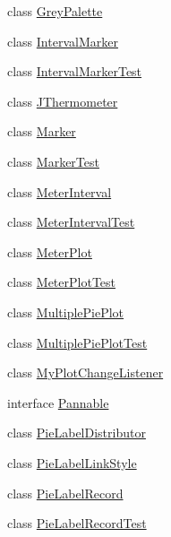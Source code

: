 \begin{DoxyCompactItemize}
class \mbox{\hyperlink{classorg_1_1jfree_1_1chart_1_1plot_1_1_grey_palette}{Grey\+Palette}}
\item 
class \mbox{\hyperlink{classorg_1_1jfree_1_1chart_1_1plot_1_1_interval_marker}{Interval\+Marker}}
\item 
class \mbox{\hyperlink{classorg_1_1jfree_1_1chart_1_1plot_1_1_interval_marker_test}{Interval\+Marker\+Test}}
\item 
class \mbox{\hyperlink{classorg_1_1jfree_1_1chart_1_1plot_1_1_j_thermometer}{J\+Thermometer}}
\item 
class \mbox{\hyperlink{classorg_1_1jfree_1_1chart_1_1plot_1_1_marker}{Marker}}
\item 
class \mbox{\hyperlink{classorg_1_1jfree_1_1chart_1_1plot_1_1_marker_test}{Marker\+Test}}
\item 
class \mbox{\hyperlink{classorg_1_1jfree_1_1chart_1_1plot_1_1_meter_interval}{Meter\+Interval}}
\item 
class \mbox{\hyperlink{classorg_1_1jfree_1_1chart_1_1plot_1_1_meter_interval_test}{Meter\+Interval\+Test}}
\item 
class \mbox{\hyperlink{classorg_1_1jfree_1_1chart_1_1plot_1_1_meter_plot}{Meter\+Plot}}
\item 
class \mbox{\hyperlink{classorg_1_1jfree_1_1chart_1_1plot_1_1_meter_plot_test}{Meter\+Plot\+Test}}
\item 
class \mbox{\hyperlink{classorg_1_1jfree_1_1chart_1_1plot_1_1_multiple_pie_plot}{Multiple\+Pie\+Plot}}
\item 
class \mbox{\hyperlink{classorg_1_1jfree_1_1chart_1_1plot_1_1_multiple_pie_plot_test}{Multiple\+Pie\+Plot\+Test}}
\item 
class \mbox{\hyperlink{classorg_1_1jfree_1_1chart_1_1plot_1_1_my_plot_change_listener}{My\+Plot\+Change\+Listener}}
\item 
interface \mbox{\hyperlink{interfaceorg_1_1jfree_1_1chart_1_1plot_1_1_pannable}{Pannable}}
\item 
class \mbox{\hyperlink{classorg_1_1jfree_1_1chart_1_1plot_1_1_pie_label_distributor}{Pie\+Label\+Distributor}}
\item 
class \mbox{\hyperlink{classorg_1_1jfree_1_1chart_1_1plot_1_1_pie_label_link_style}{Pie\+Label\+Link\+Style}}
\item 
class \mbox{\hyperlink{classorg_1_1jfree_1_1chart_1_1plot_1_1_pie_label_record}{Pie\+Label\+Record}}
\item 
class \mbox{\hyperlink{classorg_1_1jfree_1_1chart_1_1plot_1_1_pie_label_record_test}{Pie\+Label\+Record\+Test}}

\end{DoxyCompactItemize}
